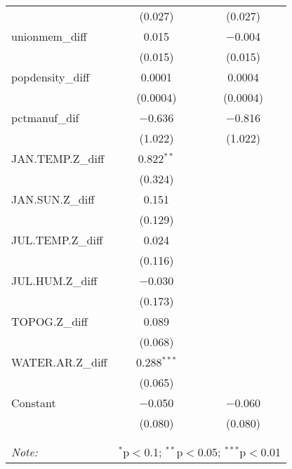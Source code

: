 \begin{table}[!htbp]
\begin{tabular}{@{\extracolsep{5pt}}lcc}
  & (0.027) & (0.027) \\ 
  unionmem\_diff & 0.015 & $-$0.004 \\ 
  & (0.015) & (0.015) \\ 
  popdensity\_diff & 0.0001 & 0.0004 \\ 
  & (0.0004) & (0.0004) \\ 
  pctmanuf\_dif & $-$0.636 & $-$0.816 \\ 
  & (1.022) & (1.022) \\ 
  JAN.TEMP.Z\_diff & 0.822$^{**}$ &  \\ 
  & (0.324) &  \\ 
  JAN.SUN.Z\_diff & 0.151 &  \\ 
  & (0.129) &  \\ 
  JUL.TEMP.Z\_diff & 0.024 &  \\ 
  & (0.116) &  \\ 
  JUL.HUM.Z\_diff & $-$0.030 &  \\ 
  & (0.173) &  \\ 
  TOPOG.Z\_diff & 0.089 &  \\ 
  & (0.068) &  \\ 
  WATER.AR.Z\_diff & 0.288$^{***}$ &  \\ 
  & (0.065) &  \\ 
  Constant & $-$0.050 & $-$0.060 \\ 
  & (0.080) & (0.080) \\ 
 \hline \\[-1.8ex] 
\hline 
\hline \\[-1.8ex] 
\textit{Note:}  & \multicolumn{2}{r}{$^{*}$p$<$0.1; $^{**}$p$<$0.05; $^{***}$p$<$0.01} \\ 
\end{tabular} 
\end{table} 
